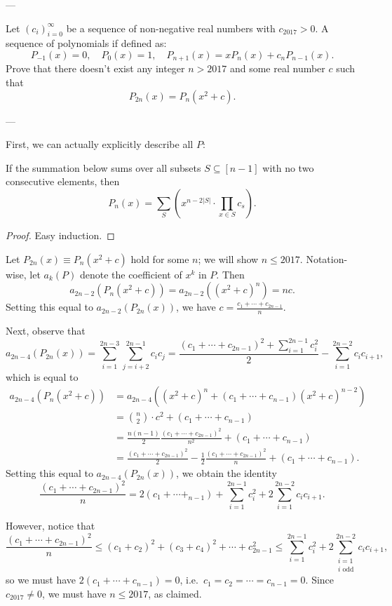 
---

Let $(c_i)_{i=0}^\infty$ be a sequence of non-negative real numbers with $c_{2017}>0$. A sequence of polynomials if defined as:
\[P_{-1}(x)=0,\quad P_0(x)=1,\quad P_{n+1}(x)=xP_n(x)+c_nP_{n-1}(x).\]
Prove that there doesn't exist any integer $n>2017$ and some real number $c$ such that
\[P_{2n}(x)=P_n(x^2+c).\]

---

First, we can actually explicitly describe all $P$:
\begin{claim*}
    If the summation below sums over all subsets $S\subseteq[n-1]$ with no two consecutive elements, then
    \[P_n(x)=\sum_S\left(x^{n-2|S|}\cdot\prod_{x\in S}c_s\right).\]
\end{claim*}
\begin{proof}
    Easy induction.
\end{proof}

Let $P_{2n}(x)\equiv P_n(x^2+c)$ hold for some $n$; we will show $n\le2017$. Notation-wise, let $a_k(P)$ denote the coefficient of $x^k$ in $P$. Then
\[a_{2n-2}\left(P_n(x^2+c)\right)=a_{2n-2}\left( (x^2+c)^n\right)=nc.\]
Setting this equal to $a_{2n-2}\left(P_{2n}(x)\right)$, we have $c=\frac{c_1+\cdots+c_{2n-1}}n$.

Next, observe that
\[a_{2n-4}\left(P_{2n}(x)\right)=\sum_{i=1}^{2n-3}\sum_{j=i+2}^{2n-1}c_ic_j=\frac{(c_1+\cdots+c_{2n-1})^2+\sum_{i=1}^{2n-1}c_i^2}2-\sum_{i=1}^{2n-2}c_ic_{i+1},\]
which is equal to
\begin{align*}
    a_{2n-4}\left(P_n(x^2+c)\right)&=a_{2n-4}\left( (x^2+c)^n+(c_1+\cdots+c_{n-1})(x^2+c)^{n-2}\right)\\
    &=\binom n2\cdot c^2+(c_1+\cdots+c_{n-1})\\
    &=\frac{n(n-1)}2\frac{(c_1+\cdots+c_{2n-1})^2}{n^2}+(c_1+\cdots+c_{n-1})\\
    &=\frac{(c_1+\cdots+c_{2n-1})^2}2-\frac12\frac{(c_1+\cdots+c_{2n-1})^2}n+(c_1+\cdots+c_{n-1}).
\end{align*}
Setting this equal to $a_{2n-4}(P_{2n}(x))$, we obtain the identity
\[\frac{(c_1+\cdots+c_{2n-1})^2}n=2(c_1+\cdots+_{n-1})+\sum_{i=1}^{2n-1}c_i^2+2\sum_{i=1}^{2n-2}c_ic_{i+1}.\]

However, notice that
\[\frac{(c_1+\cdots+c_{2n-1})^2}n\le(c_1+c_2)^2+(c_3+c_4)^2+\cdots+c_{2n-1}^2\le\sum_{i=1}^{2n-1}c_i^2+2\sum_{\substack{i=1\\ i\text{ odd}}}^{2n-2}c_ic_{i+1},\]
so we must have $2(c_1+\cdots+c_{n-1})=0$, i.e.\ $c_1=c_2=\cdots=c_{n-1}=0$. Since $c_{2017}\ne0$, we must have $n\le2017$, as claimed.

